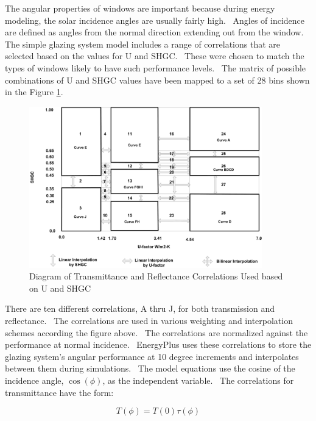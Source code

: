 The angular properties of windows are important because during energy modeling, the solar incidence angles are usually fairly high.~ Angles of incidence are defined as angles from the normal direction extending out from the window.~ The simple glazing system model includes a range of correlations that are selected based on the values for U and SHGC.~ These were chosen to match the types of windows likely to have such performance levels.~ The matrix of possible combinations of U and SHGC values have been mapped to a set of 28 bins shown in the Figure \ref{fig:diagram-of-transmittance-and}.

\begin{figure}[hbtp] %
\centering
\includegraphics[width=0.9\textwidth, height=0.9\textheight, keepaspectratio=true]{media/image947.png}
\caption{Diagram of Transmittance and Reflectance Correlations Used based on U and SHGC \label{fig:diagram-of-transmittance-and}}
\end{figure}

There are ten different correlations, A thru J, for both transmission and reflectance.~ The correlations are used in various weighting and interpolation schemes according the figure above.~ The correlations are normalized against the performance at normal incidence.~ EnergyPlus uses these correlations to store the glazing system's angular performance at 10 degree increments and interpolates between them during simulations.~ The model equations use the cosine of the incidence angle, \(\cos (\phi )\), as the independent variable.~ The correlations for transmittance have the form:

\begin{equation}
  T(\phi) = T(0) \tau (\phi )
\end{equation}

